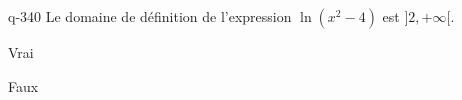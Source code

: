\begin{truefalse}{q-340}
Le domaine de définition de l'expression $\ln(x^2-4)$ est $]2,+\infty[$.
\item Vrai
\item* Faux
\end{truefalse}

